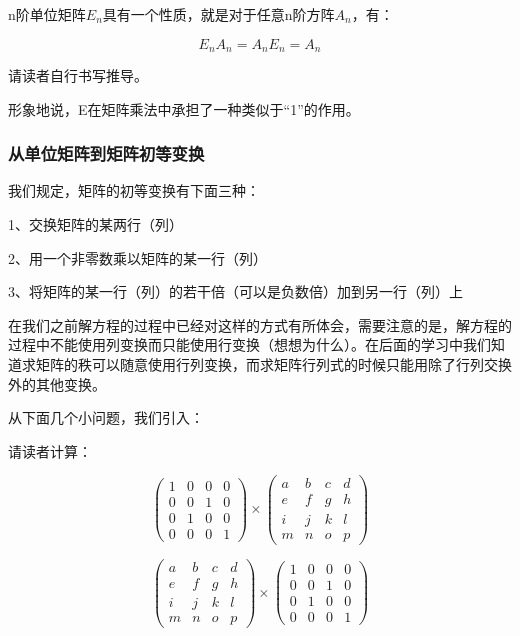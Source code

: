 \documentclass[12.8pt,a4paper,numbering = AMSalpha]{book}
\begin{document}
n阶单位矩阵$E_n$具有一个性质，就是对于任意n阶方阵$A_n$，有：

\[ E_n A_n = A_n E_n = A_n \]

请读者自行书写推导。

形象地说，E在矩阵乘法中承担了一种类似于“1”的作用。

\vspace{10pt}
\subsubsection{从单位矩阵到矩阵初等变换}

我们规定，矩阵的初等变换有下面三种：

\vspace{10pt}

1、交换矩阵的某两行（列）

2、用一个非零数乘以矩阵的某一行（列）

3、将矩阵的某一行（列）的若干倍（可以是负数倍）加到另一行（列）上

\vspace{10pt}

在我们之前解方程的过程中已经对这样的方式有所体会，需要注意的是，解方程的过程中不能使用列变换而只能使用行变换（想想为什么）。在后面的学习中我们知道求矩阵的秩可以随意使用行列变换，而求矩阵行列式的时候只能用除了行列交换外的其他变换。

\vspace{10pt}

从下面几个小问题，我们引入：

请读者计算：

\[
\begin{pmatrix}
	1&0&0&0\\
	0&0&1&0\\
	0&1&0&0\\
	0&0&0&1
\end{pmatrix}
\times
\begin{pmatrix}
	a&b&c&d\\
	e&f&g&h\\
	i&j&k&l\\
	m&n&o&p
\end{pmatrix}
\]

\[
\begin{pmatrix}
	a&b&c&d\\
	e&f&g&h\\
	i&j&k&l\\
	m&n&o&p
\end{pmatrix}
\times
\begin{pmatrix}
	1&0&0&0\\
	0&0&1&0\\
	0&1&0&0\\
	0&0&0&1
\end{pmatrix}
\]
\end{document}

